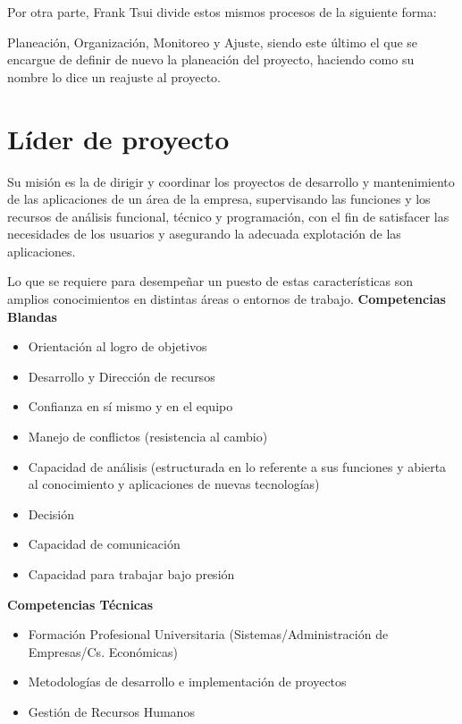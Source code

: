 Por otra parte, Frank Tsui divide estos mismos procesos de la siguiente forma: 

Planeación, Organización, Monitoreo y Ajuste, siendo este último el que se encargue de definir de nuevo la planeación del proyecto, haciendo como su nombre lo dice un reajuste al proyecto.\cite{SistemaGestor}
\section{Líder de proyecto}
Su misión es la de dirigir y coordinar los proyectos de desarrollo y mantenimiento de las aplicaciones de un área de la empresa, supervisando las funciones y los recursos de análisis funcional, técnico y programación, con el fin de satisfacer las necesidades de los usuarios y asegurando la adecuada explotación de las aplicaciones.\cite{LideresProyectos} 

Lo que se requiere para desempeñar un puesto de estas características son amplios conocimientos en distintas áreas o entornos de trabajo.
\newline \newline
\textbf {Competencias Blandas} 

\begin{itemize}
\item Orientación al logro de objetivos 

\item Desarrollo y Dirección de recursos 

\item Confianza en sí mismo y en el equipo 

\item Manejo de conflictos (resistencia al cambio) 

\item Capacidad de análisis (estructurada en lo referente a sus funciones y abierta al conocimiento y aplicaciones de nuevas tecnologías) 

\item Decisión 

\item Capacidad de comunicación 

\item Capacidad para trabajar bajo presión 
\end{itemize}

\textbf {Competencias Técnicas} 

\begin{itemize}
\item Formación Profesional Universitaria (Sistemas/Administración de Empresas/Cs. Económicas) 

\item Metodologías de desarrollo e implementación de proyectos 

\item Gestión de Recursos Humanos

\end{itemize}
